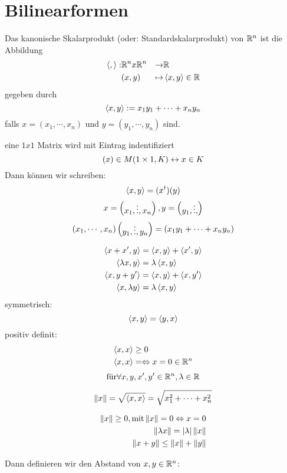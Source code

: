 \section{Bilinearformen}
Das kanonische Skalarprodukt (oder: Standardskalarprodukt) von $\mathbb{R}^n$ ist die Abbildung
\begin{align*}\left\langle , \right\rangle: & \mathbb{R}^nx\mathbb{R}^n & \to & \mathbb{R}\\
  & (x,y) & \mapsto & \left\langle x,y \right\rangle\in\mathbb{R}
\end{align*}
gegeben durch
\[\left\langle x,y \right\rangle:=x_1y_1+\cdots+x_ny_n\]
falls $x=(x_1,\cdots,x_n)$ und $y=(y_1,\cdots,y_n)$ sind.
\begin{Def}[Konvention]
eine $1x1$ Matrix wird mit Eintrag indentifiziert
\[(x)\in{}M(1\times 1,K) \leftrightarrow x\in{}K\]
Dann können wir schreiben:
\[\left\langle x,y \right\rangle=(x^t)(y)\]
\[x=\begin{pmatrix}x_1,\vdots,x_n\end{pmatrix}, y=\begin{pmatrix}y_1,\vdots,\end{pmatrix}\]
\[(x_1,\cdots,x_n)\begin{pmatrix}y_1,\vdots,y_n\end{pmatrix}=(x_1y_1+\cdots+x_ny_n)\]
\end{Def}
\begin{Bem}
\begin{align*}
  \left\langle x+x',y \right\rangle&=\left\langle x,y \right\rangle+\left\langle x',y \right\rangle\\
  \left\langle \lambda{}x,y \right\rangle&=\lambda\left\langle x,y \right\rangle\\
  \left\langle x,y+y' \right\rangle&=\left\langle x,y \right\rangle+\left\langle x,y' \right\rangle\\
  \left\langle x,\lambda{}y \right\rangle&=\lambda\left\langle x,y \right\rangle
\end{align*}
symmetrisch:
\[\left\langle x,y \right\rangle=\left\langle y,x \right\rangle\]
positiv definit:
\begin{align*}
  \left\langle x,x \right\rangle &\geq 0 \\
  \left\langle x,x \right\rangle &= \Leftrightarrow x=0\in\mathbb{R}^n
\end{align*}
\[\text{für} \forall x,y,x',y'\in\mathbb{R}^n, \lambda\in\mathbb{R}\]
\end{Bem}
\begin{Bem}
\begin{gather*}
  \left\| x \right\|=\sqrt{\left\langle x,x \right\rangle}
  =\sqrt{x^2_1+\cdots+x_n^2}
\end{gather*}
\end{Bem}
\begin{Bem}
\begin{align*}
  \left\| x \right\|\geq0, \text{mit} \left\| x \right\|=0 \Leftrightarrow x=0\\
  \left\| \lambda{}x \right\|=\left| \lambda \right|\left\| x \right\|\\
  \left\| x+y \right\|\leq\left\| x \right\|+\left\| y \right\|
\end{align*}
\end{Bem}
Dann definieren wir den Abstand von $x,y\in\mathbb{R}^n$:

